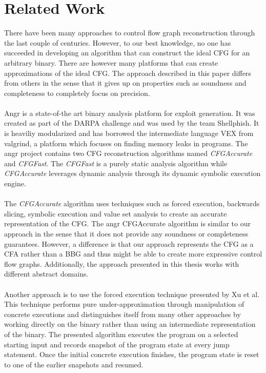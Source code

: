 \documentclass{kththesis}
\begin{document}
\section{Related Work}
There have been many approaches to control flow graph reconstruction through the last couple of centuries. However, to our best knowledge, no one has succeeded in developing an algorithm that can construct the ideal CFG for an arbitrary binary. There are however many platforms that can create approximations of the ideal CFG. The approach described in this paper differs from others in the sense that it gives up on properties such as soundness and completeness to completely focus on precision. 
\\ \\
Angr\cite{angr} is a state-of-the art binary analysis platform for exploit generation. It was created as part of the DARPA challenge and was used by the team Shellphish. It is heaviliy modularized and has borrowed the intermediate language VEX from valgrind, a platform which focuses on finding memory leaks in programs. The angr project contains two CFG reconstruction algorithms named \textit{CFGAccurate} and \textit{CFGFast}. The \textit{CFGFast} is a purely static analysis algorithm while \textit{CFGAccurate} leverages dynamic analysis through its dynamic symbolic execution engine. 
\\ \\
The \textit{CFGAccurate} algorithm uses techniques such as forced execution, backwards slicing, symbolic execution and value set analysis to create an accurate representation of the CFG. The angr CFGAccurate algorithm is similar to our approach in the sense that it does not provide any soundness or completeness guarantees. However, a difference is that our approach represents the CFG as a CFA rather than a BBG and thus might be able to create more expressive control flow graphs. Additionally, the approach presented in this thesis works with different abstract domains.
\\ \\
Another approach is to use the forced execution technique presented by Xu et al\cite{preciseCFG}. This technique performs pure under-approximation through manipulation of concrete executions and distinguishes itself from many other approaches by working directly on the binary rather than using an intermediate representation of the binary. The presented algorithm executes the program on a selected starting input and records snapshot of the program state at every jump statement. Once the initial concrete execution finishes, the program state is reset to one of the earlier snapshots and resumed. 
\end{document}
